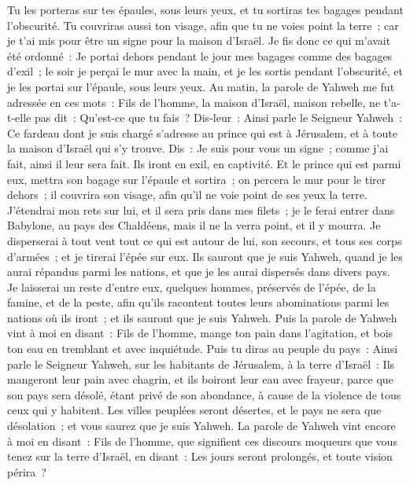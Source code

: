 \begin{multicols}{2}
Tu les porteras sur tes épaules, sous leurs yeux, et tu sortiras tes bagages pendant l'obscurité. Tu couvriras aussi ton visage, afin que tu ne voies point la terre~; car je t'ai mis pour être un signe pour la maison d'Israël.
Je fis donc ce qui m'avait été ordonné~: Je portai dehors pendant le jour mes bagages comme des bagages d'exil~; le soir je perçai le mur avec la main, et je les sortis pendant l'obscurité, et je les portai sur l'épaule, sous leurs yeux.
Au matin, la parole de Yahweh me fut adressée en ces mots~:
Fils de l'homme, la maison d'Israël, maison rebelle, ne t'a-t-elle pas dit~: Qu'est-ce que tu fais~?
Dis-leur~: Ainsi parle le Seigneur Yahweh~: Ce fardeau dont je suis chargé s'adresse au prince qui est à Jérusalem, et à toute la maison d'Israël qui s'y trouve.
Dis~: Je suis pour vous un signe~; comme j'ai fait, ainsi il leur sera fait. Ils iront en exil, en captivité.
Et le prince qui est parmi eux, mettra son bagage sur l'épaule et sortira~; on percera le mur pour le tirer dehors~; il couvrira son visage, afin qu'il ne voie point de ses yeux la terre.
J'étendrai mon rets sur lui, et il sera pris dans mes filets~; je le ferai entrer dans Babylone, au pays des Chaldéens, mais il ne la verra point, et il y mourra.
Je disperserai à tout vent tout ce qui est autour de lui, son secours, et tous ses corps d'armées~; et je tirerai l'épée sur eux.
Ils sauront que je suis Yahweh, quand je les aurai répandus parmi les nations, et que je les aurai dispersés dans divers pays.
Je laisserai un reste d'entre eux, quelques hommes, préservés de l'épée, de la famine, et de la peste, afin qu'ils racontent toutes leurs abominations parmi les nations où ils iront~; et ils sauront que je suis Yahweh.
Puis la parole de Yahweh vint à moi en disant~:
Fils de l'homme, mange ton pain dans l'agitation, et bois ton eau en tremblant et avec inquiétude.
Puis tu diras au peuple du pays~: Ainsi parle le Seigneur Yahweh, sur les habitants de Jérusalem, à la terre d'Israël~: Ils mangeront leur pain avec chagrin, et ils boiront leur eau avec frayeur, parce que son pays sera désolé, étant privé de son abondance, à cause de la violence de tous ceux qui y habitent.
Les villes peuplées seront désertes, et le pays ne sera que désolation~; et vous saurez que je suis Yahweh.
La parole de Yahweh vint encore à moi en disant~:
Fils de l'homme, que signifient ces discours moqueurs que vous tenez sur la terre d'Israël, en disant~: Les jours seront prolongés, et toute vision périra~?

\end{multicols}
